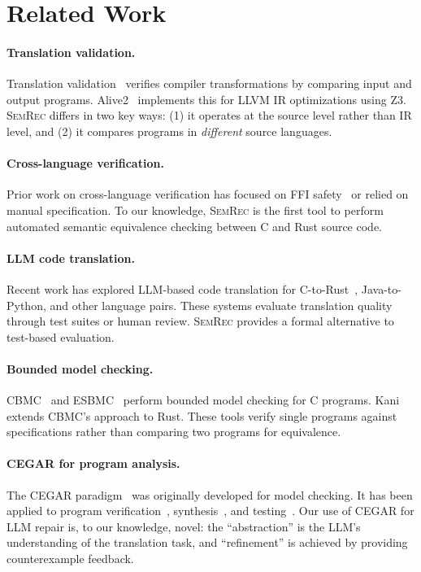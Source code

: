 \documentclass[10pt,letterpaper]{article}
\begin{document}
\section{Related Work}
\label{sec:related}

\paragraph{Translation validation.}
Translation validation~\cite{pnueli1998translation} verifies compiler
transformations by comparing input and output programs. Alive2~\cite{alive2}
implements this for LLVM IR optimizations using Z3. \textsc{SemRec} differs in
two key ways: (1) it operates at the source level rather than IR level, and
(2) it compares programs in \emph{different} source languages.

\paragraph{Cross-language verification.}
Prior work on cross-language verification has focused on FFI
safety~\cite{li2022ffi} or relied on manual specification. To our knowledge,
\textsc{SemRec} is the first tool to perform automated semantic equivalence
checking between C and Rust source code.

\paragraph{LLM code translation.}
Recent work has explored LLM-based code translation for
C-to-Rust~\cite{yang2024vert,eniser2024towards}, Java-to-Python, and other
language pairs. These systems evaluate translation quality through test suites
or human review. \textsc{SemRec} provides a formal alternative to test-based
evaluation.

\paragraph{Bounded model checking.}
CBMC~\cite{cbmc} and ESBMC~\cite{esbmc} perform bounded model checking for
C programs. Kani~\cite{kani} extends CBMC's approach to Rust. These tools verify
single programs against specifications rather than comparing two programs for
equivalence.

\paragraph{CEGAR for program analysis.}
The CEGAR paradigm~\cite{clarke2000cegar} was originally developed for model
checking. It has been applied to program verification~\cite{beyer2011cpachecker},
synthesis~\cite{solar2006combinatorial}, and testing~\cite{godefroid2005dart}.
Our use of CEGAR for LLM repair is, to our knowledge, novel: the ``abstraction''
is the LLM's understanding of the translation task, and ``refinement'' is achieved
by providing counterexample feedback.
\end{document}
